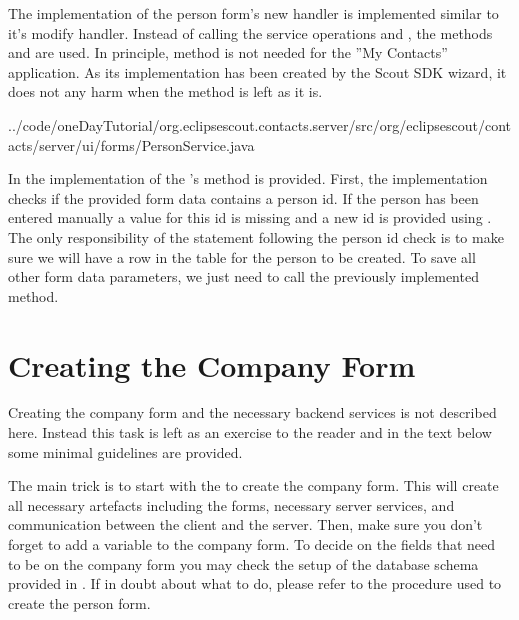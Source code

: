 \documentclass[a4paper,10pt,twoside]{book}
\begin{document}
The implementation of the person form's new handler is implemented similar to it's modify handler. 
Instead of calling the service operations  and , the methods   and  are used. 
In principle, method  is not needed for the ''My Contacts'' application. 
As its implementation has been created by the Scout SDK wizard, it does not any harm when the method is left as it is. 


{../code/oneDayTutorial/org.eclipsescout.contacts.server/src/org/eclipsescout/contacts/server/ui/forms/PersonService.java}

In  the implementation of the 's  method is provided. 
First, the implementation checks if the provided form data contains a person id. 
If the person has been entered manually a value for this id is missing and a new id is provided using .
The only responsibility of the  statement following the person id check is to make sure we will have a row in the  table for the person to be created. 
To save all other form data parameters, we just need to call the previously implemented  method. 


\section{Creating the Company Form}

Creating the company form and the necessary backend services is not described here.
Instead this task is left as an exercise to the reader and in the text below some minimal guidelines are provided.

The main trick is to start with the  to create the company form. 
This will create all necessary artefacts including the forms, necessary server services, and communication between the client and the server. 
Then, make sure you don't forget to add a variable  to the company form. 
To decide on the fields that need to be on the company form you may check the setup of the database schema provided in . 
If in doubt about what to do, please refer to the procedure used to create the person form. 
\end{document}
